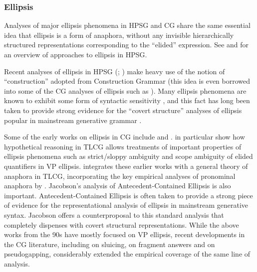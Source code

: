 \documentclass[output=paper
                ,modfonts
 	        ,biblatex
                ,babelshorthands
                ,newtxmath
                ,draftmode
                ,colorlinks, citecolor=brown
]{langscibook}
\begin{document}
\subsubsection{Ellipsis}

Analyses of major ellipsis phenomena in HPSG and CG share the same
essential idea that ellipsis is a form of anaphora, without any
invisible hierarchically structured representations corresponding to
the ``elided'' expression. See  and
\citet{ginzburg-miller-ellipsis-handbook} for an
overview of approaches to ellipsis in HPSG.

Recent analyses of ellipsis in HPSG (\citealt[Chapter 8]{GSag2000a-u}; \citealt{millereisspseudo})
make heavy use of the notion of ``construction'' adopted from
Construction Grammar (this idea is even borrowed into some of the CG
analyses of ellipsis such as \citealt{Jacobson2016}). Many ellipsis phenomena
are known to exhibit some form of syntactic sensitivity
\citep{kennedy2003,chung13,yoshida-ea-pg}, and this fact has long been
taken to provide strong evidence for the ``covert structure'' analyses
of ellipsis popular in mainstream generative grammar \citep{merchant13}.

Some of the early works on ellipsis in CG include
\citet{hendriks-diss} and \citet{morrillmerenciano1996}.
\citet{morrillmerenciano1996} in particular show how hypothetical
reasoning in TLCG allows treatments of important properties of
ellipsis phenomena such as strict/sloppy ambiguity and scope ambiguity
of elided quantifiers in VP ellipsis. \citet{jaeger05} integrates
these earlier works with a general theory of anaphora in TLCG,
incorporating the key empirical analyses of pronominal anaphora by
\citet{Jacobson1999a,Jacobson2000a}. Jacobson's
\citeyearpar{Jacobson_p1998a,Jacobson2008} analysis of
Antecedent-Contained Ellipsis is also important. Antecedent-Contained
Ellipsis is often taken to provide a strong piece of evidence for the
representational analysis of ellipsis in mainstream generative syntax.
Jacobson offers a counterproposal to this standard analysis that
completely dispenses with covert structural representations. While the
above works from the 90s have mostly focused on VP ellipsis, recent
developments in the CG literature, including \citet{barker-sluicing}
on sluicing, \citet{Jacobson2016} on fragment answers and
\citet{kubota-levine-pseudo} on pseudogapping, considerably extended
the empirical coverage of the same line of analysis.
\end{document}
